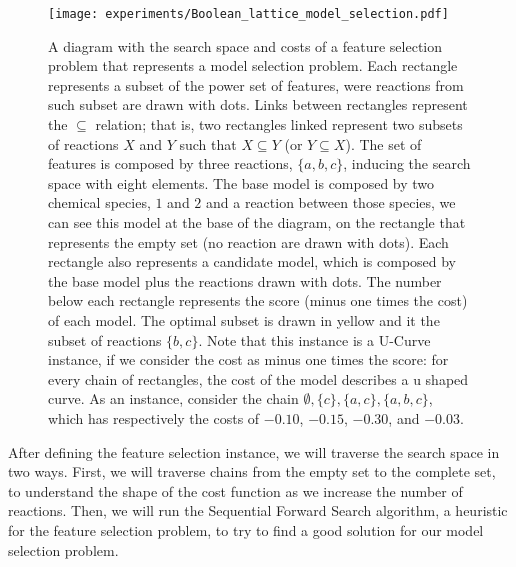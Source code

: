 \begin{figure}[h!]
\begin{center}
    \texttt{[image: experiments/Boolean\_lattice\_model\_selection.pdf]}
    \caption{A diagram with the search space and costs of a feature 
    selection problem that represents a model selection problem. Each 
    rectangle represents a subset of the power set of features, were
    reactions from such subset are drawn with dots. Links between 
    rectangles represent the $\subseteq$ relation; that is, two 
    rectangles linked represent two subsets of reactions $X$ and $Y$ 
    such that $X \subseteq Y$ (or $Y \subseteq X$). The set of features 
    is composed by three reactions, $\{a, b, c\}$, inducing the search 
    space with eight elements. The base model is composed by two 
    chemical species, $1$ and $2$ and a reaction between those species, 
    we can see this model at the base of the diagram, on the rectangle 
    that represents the empty set (no reaction are drawn with dots). 
    Each rectangle also represents a candidate model, which is composed 
    by the base model plus the reactions drawn with dots. The number
    below each rectangle represents the score (minus one times the cost)
    of each model. The optimal subset is drawn in yellow and it the
    subset of reactions $\{b, c\}$. Note that this instance is a U-Curve 
    instance, if we consider the cost as minus one times the score: for 
    every chain of rectangles, the cost of the model describes a u 
    shaped curve. As an instance, consider the chain $\emptyset, \{c\} 
    , \{a, c\}, \{a, b, c\}$, which has respectively the costs of
    $-0.10$, $-0.15$, $-0.30$, and $-0.03$.}
    \label{fig:feature_selection_model_selection}
    \end{center}
\end{figure}

After defining the feature selection instance, we will traverse the
search space in two ways. First, we will traverse chains from the empty
set to the complete set, to understand the shape of the cost function as
we increase the number of reactions. Then, we will run the Sequential 
Forward Search algorithm, a heuristic for the feature selection problem,
to try to find a good solution for our model selection problem.





